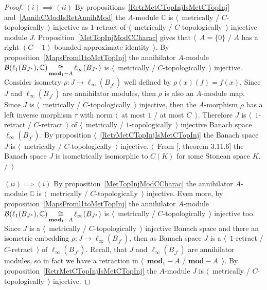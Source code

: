 \begin{proof} $(i)\implies (ii)$ By 
propositions~\ref{RetrMetCTopInjIsMetCTopInj} and~\ref{AnnihCModIsRetAnnihMod} 
the $A$-module $\mathbb{C}$ is
$\langle$~metrically / $C$-topologically~$\rangle$ injective as $1$-retract of
$\langle$~metrically / $C$-topologically~$\rangle$ injective module $J$.
Proposition~\ref{MetTopInjModCCharac} gives that $\langle$~$A= \{0 \}$ / $A$ has
a right $(C-1)$-bounded approximate identity~$\rangle$. By
proposition~\ref{MapsFroml1toMetTopInj} the annihilator $A$-module
$\mathcal{B}(\ell_1(B_{J^*}),\mathbb{C})
\mathop{\mathbin{\cong}}\limits_{\mathbf{mod}_1-A}
\ell_\infty(B_{J^*})$ is $\langle$~metrically / $C$-topologically~$\rangle$ 
injective. Consider isometry $\rho:J\to\ell_\infty(B_{J^*})$ 
well defined by $\rho(x)(f)=f(x)$. Since $J$ and $\ell_\infty(B_{J^*})$ are 
annihilator modules, then $\rho$ is also an $A$-module map. 
Since $J$ is $\langle$~metrically / $C$-topologically~$\rangle$ injective, 
then the $A$-morphism $\rho$ has a left inverse morphism $\tau$ with 
norm $\langle$~at most $1$ / at most $C$~$\rangle$.
Therefore $J$ is $\langle$~$1$-retract / $C$-retract~$\rangle$ of
$\langle$~metrically / $1$-topologically~$\rangle$ injective Banach space
$\ell_\infty(B_{J^*})$. By 
proposition $\langle$~\ref{RetrMetCTopInjIsMetCTopInj} the Banach space $J$ is
$\langle$~metrically / $C$-topologically~$\rangle$ injective. $\langle$~From
[\cite{LaceyIsomThOfClassicBanSp}, theorem 3.11.6] the Banach space $J$ is
isometrically isomorphic to $C(K)$ for some Stonean space $K$. /~$\rangle$ 

$(ii)\implies (i)$ By proposition~\ref{MetTopInjModCCharac} the annihilator
$A$-module $\mathbb{C}$ is $\langle$~metrically / $C$-topologically~$\rangle$
injective. Even more, by proposition~\ref{MapsFroml1toMetTopInj} 
the annihilator $A$-module
$\mathcal{B}(\ell_1(B_{J^*}),\mathbb{C})
\mathop{\mathbin{\cong}}\limits_{\mathbf{mod}_1-A}
\ell_\infty(B_{J^*})$ is $\langle$~metrically / $C$-topologically~$\rangle$ 
injective too. Since $J$ is a $\langle$~metrically / $C$-topologically~$\rangle$
injective Banach space and there an isometric 
embedding $\rho:J\to \ell_\infty(B_{J^*})$, then as
Banach space $J$ is a $\langle$~$1$-retract / $C$-retract~$\rangle$ of
$\ell_\infty(B_{J^*})$. Recall, that $J$ and $\ell_\infty(B_{J^*})$ are
annihilator modules, so in fact we have a retraction in
$\langle$~$\mathbf{mod}_1-A$ / $\mathbf{mod}-A$~$\rangle$. By 
proposition~\ref{RetrMetCTopInjIsMetCTopInj} the $A$-module $J$ 
is $\langle$~metrically / $C$-topologically~$\rangle$ injective.
\end{proof}

